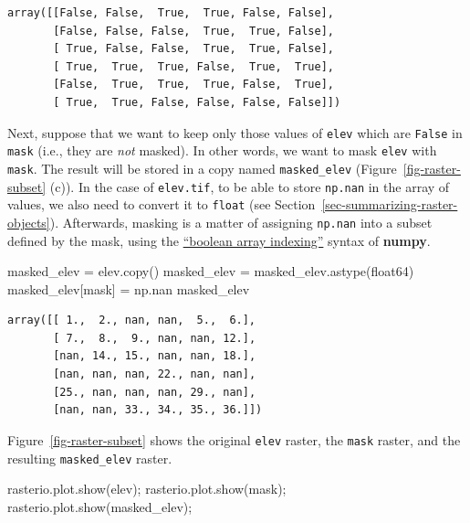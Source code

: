 \documentclass[
  letterpaper,
]{krantz}
\newenvironment{Shaded}{\begin{snugshade}}{\end{snugshade}}
\newcommand{\NormalTok}[1]{\textcolor[rgb]{0.00,0.23,0.31}{#1}}
\newcommand{\OperatorTok}[1]{\textcolor[rgb]{0.37,0.37,0.37}{#1}}
\newcommand{\StringTok}[1]{\textcolor[rgb]{0.13,0.47,0.30}{#1}}
\begin{document}
\begin{verbatim}
array([[False, False,  True,  True, False, False],
       [False, False, False,  True,  True, False],
       [ True, False, False,  True,  True, False],
       [ True,  True,  True, False,  True,  True],
       [False,  True,  True,  True, False,  True],
       [ True,  True, False, False, False, False]])
\end{verbatim}

Next, suppose that we want to keep only those values of \texttt{elev}
which are \texttt{False} in \texttt{mask} (i.e., they are \emph{not}
masked). In other words, we want to mask \texttt{elev} with
\texttt{mask}. The result will be stored in a copy named
\texttt{masked\_elev} (Figure~\ref{fig-raster-subset} (c)). In the case
of \texttt{elev.tif}, to be able to store \texttt{np.nan} in the array
of values, we also need to convert it to \texttt{float} (see
Section~\ref{sec-summarizing-raster-objects}). Afterwards, masking is a
matter of assigning \texttt{np.nan} into a subset defined by the mask,
using the
\href{https://numpy.org/doc/stable/user/basics.indexing.html\#boolean-array-indexing}{``boolean
array indexing''} syntax of \textbf{numpy}.

\begin{Shaded}
\begin{Highlighting}[]
\NormalTok{masked\_elev }\OperatorTok{=}\NormalTok{ elev.copy()}
\NormalTok{masked\_elev }\OperatorTok{=}\NormalTok{ masked\_elev.astype(}\StringTok{\textquotesingle{}float64\textquotesingle{}}\NormalTok{)}
\NormalTok{masked\_elev[mask] }\OperatorTok{=}\NormalTok{ np.nan}
\NormalTok{masked\_elev}
\end{Highlighting}
\end{Shaded}

\begin{verbatim}
array([[ 1.,  2., nan, nan,  5.,  6.],
       [ 7.,  8.,  9., nan, nan, 12.],
       [nan, 14., 15., nan, nan, 18.],
       [nan, nan, nan, 22., nan, nan],
       [25., nan, nan, nan, 29., nan],
       [nan, nan, 33., 34., 35., 36.]])
\end{verbatim}

Figure~\ref{fig-raster-subset} shows the original \texttt{elev} raster,
the \texttt{mask} raster, and the resulting \texttt{masked\_elev}
raster.

\begin{Shaded}
\begin{Highlighting}[]
\NormalTok{rasterio.plot.show(elev)}\OperatorTok{;}
\NormalTok{rasterio.plot.show(mask)}\OperatorTok{;}
\NormalTok{rasterio.plot.show(masked\_elev)}\OperatorTok{;}
\end{Highlighting}
\end{Shaded}
\end{document}
